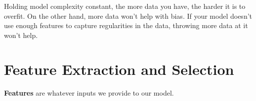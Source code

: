 
Holding model complexity constant,
the more data you have, the harder it is to overfit. On the other hand, more data won't
help with bias. If your model doesn't use enough features to capture regularities in the
data, throwing more data at it won't help.

\section{Feature Extraction and Selection}

\textbf{Features} are whatever inputs we provide to our model.
